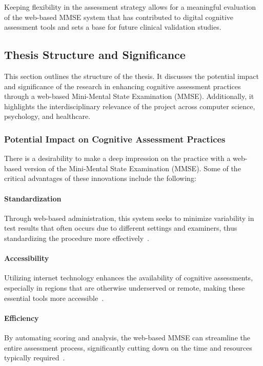 Keeping flexibility in the assessment strategy allows for a meaningful evaluation of the web-based MMSE system that has contributed to digital cognitive assessment tools and sets a base for future clinical validation studies.

\subsection{Thesis Structure and Significance} 

This section outlines the structure of the thesis. It discusses the potential impact and significance of the research in enhancing cognitive assessment practices through a web-based Mini-Mental State Examination (MMSE). Additionally, it highlights the interdisciplinary relevance of the project across computer science, psychology, and healthcare.

\subsubsection{Potential Impact on Cognitive Assessment Practices}

There is a desirability to make a deep impression on the practice with a web-based version of the Mini-Mental State Examination (MMSE). Some of the critical advantages of these innovations include the following:

\paragraph{Standardization} Through web-based administration, this system seeks to minimize variability in test results that often occurs due to different settings and examiners, thus standardizing the procedure more effectively~\cite{Wild2021}.

\paragraph{Accessibility} Utilizing internet technology enhances the availability of cognitive assessments, especially in regions that are otherwise underserved or remote, making these essential tools more accessible~\cite{Bauer2012}.

\paragraph{Efficiency} By automating scoring and analysis, the web-based MMSE can streamline the entire assessment process, significantly cutting down on the time and resources typically required~\cite{Zygouris2017}.

